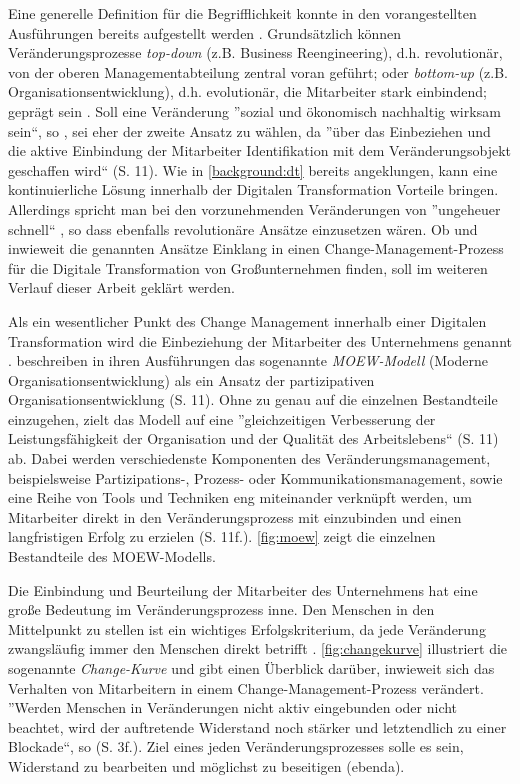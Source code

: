 Eine generelle Definition für die Begrifflichkeit konnte in den vorangestellten Ausführungen bereits aufgestellt werden \cite{kaune_change_2016}. Grundsätzlich können Veränderungsprozesse \textit{top-down} (z.B. Business Reengineering), d.h. revolutionär, von der oberen Managementabteilung zentral voran geführt; oder \textit{bottom-up} (z.B. Organisationsentwicklung), d.h. evolutionär, die Mitarbeiter stark einbindend; geprägt sein \cite[S. 10]{kaune_change_2016}. Soll eine Veränderung ''sozial und ökonomisch nachhaltig wirksam sein``, so , sei eher der zweite Ansatz zu wählen, da ''über
das Einbeziehen und die aktive Einbindung der Mitarbeiter Identifikation mit dem Veränderungsobjekt geschaffen wird`` (S. 11). Wie in \ref{background:dt} bereits angeklungen, kann eine kontinuierliche Lösung innerhalb der Digitalen Transformation Vorteile bringen. Allerdings spricht man bei den vorzunehmenden Veränderungen von ''ungeheuer schnell``  \cite[S. 10]{oswald_digitale_2018} , so dass ebenfalls revolutionäre Ansätze einzusetzen wären. Ob und inwieweit die genannten Ansätze Einklang in einen Change-Management-Prozess für die Digitale Transformation von Großunternehmen finden, soll im weiteren Verlauf dieser Arbeit geklärt werden.

Als ein wesentlicher Punkt des Change Management innerhalb einer Digitalen Transformation wird die Einbeziehung der Mitarbeiter des Unternehmens genannt \cite[S. 179f.]{hess_digitale_2019}.  beschreiben in ihren Ausführungen das sogenannte \textit{MOEW-Modell} (Moderne Organisationsentwicklung) als ein Ansatz der partizipativen Organisationsentwicklung (S. 11). Ohne zu genau auf die einzelnen Bestandteile einzugehen, zielt das Modell auf eine ''gleichzeitigen Verbesserung der Leistungsfähigkeit der Organisation und der Qualität des Arbeitslebens`` (S. 11) ab. Dabei werden verschiedenste Komponenten des Veränderungsmanagement, beispielsweise Partizipations-, Prozess- oder Kommunikationsmanagement, sowie eine Reihe von Tools und Techniken eng miteinander verknüpft werden, um Mitarbeiter direkt in den Veränderungsprozess mit einzubinden und einen langfristigen Erfolg zu erzielen (S. 11f.). \ref{fig:moew} zeigt die einzelnen Bestandteile des MOEW-Modells.

Die Einbindung und Beurteilung der Mitarbeiter des Unternehmens hat eine große Bedeutung im Veränderungsprozess inne. Den Menschen in den Mittelpunkt zu stellen ist ein wichtiges Erfolgskriterium, da jede Veränderung zwangsläufig immer den Menschen direkt betrifft \cite[S. 3]{bertagnolli_change_2018}. \ref{fig:changekurve} illustriert die sogenannte \textit{Change-Kurve} und gibt einen Überblick darüber, inwieweit sich das Verhalten von Mitarbeitern in einem Change-Management-Prozess verändert. ''Werden Menschen in Veränderungen nicht aktiv eingebunden oder nicht beachtet, wird der auftretende Widerstand noch stärker und letztendlich zu einer Blockade``, so  (S. 3f.). Ziel eines jeden Veränderungsprozesses solle es sein, Widerstand zu bearbeiten und möglichst zu beseitigen (ebenda). 

